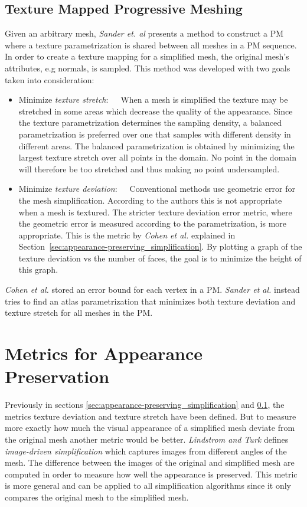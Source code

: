 \subsection{Texture Mapped Progressive Meshing} \label{sec:texture_mapped_progressive_meshing}
Given an arbitrary mesh, \emph{Sander et. al} \cite{sander2001texture} presents a method to construct a PM where a texture parametrization is shared between all meshes in a PM sequence. In order to create a texture mapping for a simplified mesh, the original mesh's attributes, e.g normals, is sampled. This method was developed with two goals taken into consideration:
\begin{itemize}
\item{Minimize \emph{texture stretch}:}~~~When a mesh is simplified the texture may be stretched in some areas which decrease the quality of the appearance. Since the texture parametrization determines the sampling density, a balanced parametrization is preferred over one that samples with different density in different areas. The balanced parametrization is obtained by minimizing the largest texture stretch over all points in the domain. No point in the domain will therefore be too stretched and thus making no point undersampled. 
\item{Minimize \emph{texture deviation}:}~~~Conventional methods use geometric error for the mesh simplification. According to the authors this is not appropriate when a mesh is textured. The stricter texture deviation error metric, where the geometric error is measured according to the parametrization, is more appropriate. This is the metric by \emph{Cohen et al.} \cite{cohen1998appearance} explained in Section~\ref{sec:appearance-preserving_simplification}. By plotting a graph of the texture deviation vs the number of faces, the goal is to minimize the height of this graph.
\end{itemize}

\emph{Cohen et al.} \cite{cohen1998appearance} stored an error bound for each vertex in a PM. \emph{Sander et al.} \cite{sander2001texture} instead tries to find an atlas parametrization that minimizes both texture deviation and texture stretch for all meshes in the PM. 

\section{Metrics for Appearance Preservation} \label{sec:metrics_for_appearance_preservation}
Previously in sections \ref{sec:appearance-preserving_simplification} and \ref{sec:texture_mapped_progressive_meshing}, the metrics texture deviation and texture stretch have been defined. But to measure more exactly how much the visual appearance of a simplified mesh deviate from the original mesh another metric would be better. \emph{Lindstrom and Turk} \cite{lindstrom2000image} defines \emph{image-driven simplification} which captures images from different angles of the mesh. The difference between the images of the original and simplified mesh are computed in order to measure how well the appearance is preserved. This metric is more general and can be applied to all simplification algorithms since it only compares the original mesh to the simplified mesh.

